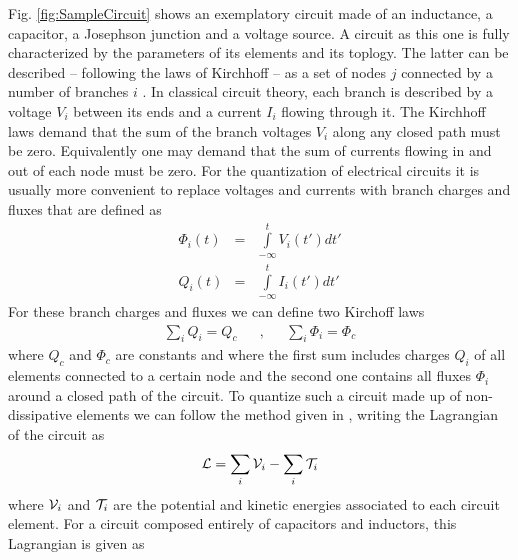 Fig. \ref{fig:SampleCircuit} shows an exemplatory circuit made of an inductance, a capacitor, a Josephson junction and a voltage source. A circuit as this one is fully characterized by the parameters of its elements and its toplogy. The latter can be described -- following the laws of Kirchhoff -- as a set of nodes $j$ connected by a number of branches $i$ . In classical circuit theory, each branch is described by a voltage $V_i$ between its ends and a current $I_{i}$ flowing through it. The Kirchhoff laws demand that the sum of the branch voltages $V_i$ along any closed path must be zero. Equivalently one may demand that the sum of currents flowing in and out of each node must be zero. For the quantization of electrical circuits it is usually more convenient to replace voltages and currents with branch charges and fluxes that are defined as
%
\begin{eqnarray}
\Phi_i(t) & = & \int\limits_{-\infty}^t V_i(t') dt' \\
Q_i(t) & = & \int\limits_{-\infty}^t I_i(t') dt'
\end{eqnarray}
%
For these branch charges and fluxes we can define two Kirchoff laws
%
\begin{align}
\sum\limits_{i} Q_i  =  Q_c & & , & & \sum\limits_{i}\Phi_i = \Phi_c \label{eq:kirchhoff_charge}
\end{align}
%
where $Q_c$ and $\Phi_c$ are constants and where the first sum includes charges $Q_i$ of all elements connected to a certain node and the second one contains all fluxes $\Phi_i$ around a closed path of the circuit. To quantize such a circuit made up of non-dissipative elements we can follow the method given in \cite{yurke_quantum_1984}, writing the Lagrangian of the circuit as 
%
\begin{equation}
\begin{mathcal}L\end{mathcal} = \sum\limits_i \begin{mathcal}V\end{mathcal}_i - \sum\limits_i \begin{mathcal}T\end{mathcal}_i
\end{equation}
%
where $\begin{mathcal}V\end{mathcal}_i$ and $\begin{mathcal}T\end{mathcal}_i$ are the potential and kinetic energies associated to each circuit element. For a circuit composed entirely of capacitors and inductors, this Lagrangian is given as
